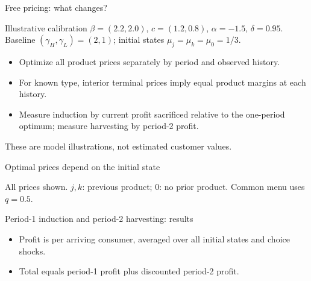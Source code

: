 \documentclass[aspectratio=169,11pt]{beamer}
\begin{document}
\begin{frame}[label=Simulation]{Free pricing: what changes?}
\begin{block}{Illustrative calibration}
$\beta=(2.2,2.0)$, $c=(1.2,0.8)$, $\alpha=-1.5$, $\delta=0.95$.\\
Baseline $(\gamma_H,\gamma_L)=(2,1)$; initial states $\mu_j=\mu_k=\mu_0=1/3$.
\end{block}
\begin{itemize}
\item Optimize all product prices separately by period and observed history.
\item For known type, interior terminal prices imply equal product margins at each history.
\item Measure induction by current profit sacrificed relative to the one-period optimum; measure harvesting by period-2 profit.
\end{itemize}
\small These are model illustrations, not estimated customer values.
\hyperlink{pricing-details}{}
\end{frame}

\begin{frame}[label=pricing-menus]{Optimal prices depend on the initial state}
\centering\footnotesize\setlength{\tabcolsep}{9pt}\renewcommand{\arraystretch}{1.0}\setlength{\parskip}{0pt}

\par\vspace{4pt}\scriptsize All prices shown. $j,k$: previous product; $0$: no prior product. Common menu uses $q=0.5$.
\end{frame}

\begin{frame}{Period-1 induction and period-2 harvesting: results}
\centering\small\setlength{\tabcolsep}{7pt}\renewcommand{\arraystretch}{1.35}

\par\medskip
\begin{itemize}
\item Profit is per arriving consumer, averaged over all initial states and choice shocks.
\item Total equals period-1 profit plus discounted period-2 profit.
\end{itemize}
\end{frame}
\end{document}
